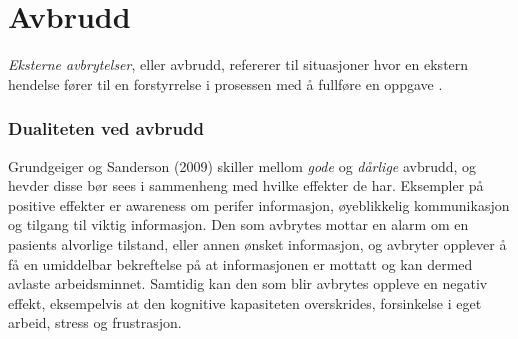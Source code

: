 \section{Avbrudd}
\label{chp: avbrudd} 
\emph{Eksterne avbrytelser}, eller avbrudd, refererer til situasjoner hvor en ekstern hendelse fører til en forstyrrelse i prosessen med å fullføre en oppgave \cite{Harr07}.

\subsubsection{Dualiteten ved avbrudd}
Grundgeiger og Sanderson (2009)\nocite{Grundgeiger09} skiller mellom \emph{gode} og \emph{dårlige} avbrudd, og hevder disse bør sees i sammenheng med hvilke effekter de har. Eksempler på positive effekter er awareness om perifer informasjon, øyeblikkelig kommunikasjon og tilgang til viktig informasjon.
Den som avbrytes mottar en alarm om en pasients alvorlige tilstand, eller annen ønsket informasjon, og avbryter opplever å få en umiddelbar bekreftelse på at informasjonen er mottatt og kan dermed avlaste arbeidsminnet. Samtidig kan den som blir avbrytes oppleve en negativ effekt, eksempelvis at den kognitive kapasiteten overskrides, forsinkelse i eget arbeid, stress og frustrasjon. 

